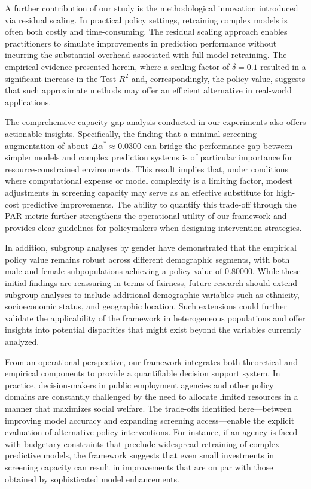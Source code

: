 \documentclass{article}
\begin{document}
A further contribution of our study is the methodological innovation introduced via residual scaling. In practical policy settings, retraining complex models is often both costly and time-consuming. The residual scaling approach enables practitioners to simulate improvements in prediction performance without incurring the substantial overhead associated with full model retraining. The empirical evidence presented herein, where a scaling factor of \(\delta=0.1\) resulted in a significant increase in the Test \(R^2\) and, correspondingly, the policy value, suggests that such approximate methods may offer an efficient alternative in real-world applications.

The comprehensive capacity gap analysis conducted in our experiments also offers actionable insights. Specifically, the finding that a minimal screening augmentation of about \(\Delta\alpha^* \approx 0.0300\) can bridge the performance gap between simpler models and complex prediction systems is of particular importance for resource-constrained environments. This result implies that, under conditions where computational expense or model complexity is a limiting factor, modest adjustments in screening capacity may serve as an effective substitute for high-cost predictive improvements. The ability to quantify this trade-off through the PAR metric further strengthens the operational utility of our framework and provides clear guidelines for policymakers when designing intervention strategies.

In addition, subgroup analyses by gender have demonstrated that the empirical policy value remains robust across different demographic segments, with both male and female subpopulations achieving a policy value of 0.80000. While these initial findings are reassuring in terms of fairness, future research should extend subgroup analyses to include additional demographic variables such as ethnicity, socioeconomic status, and geographic location. Such extensions could further validate the applicability of the framework in heterogeneous populations and offer insights into potential disparities that might exist beyond the variables currently analyzed.

From an operational perspective, our framework integrates both theoretical and empirical components to provide a quantifiable decision support system. In practice, decision-makers in public employment agencies and other policy domains are constantly challenged by the need to allocate limited resources in a manner that maximizes social welfare. The trade-offs identified here—between improving model accuracy and expanding screening access—enable the explicit evaluation of alternative policy interventions. For instance, if an agency is faced with budgetary constraints that preclude widespread retraining of complex predictive models, the framework suggests that even small investments in screening capacity can result in improvements that are on par with those obtained by sophisticated model enhancements.
\end{document}
